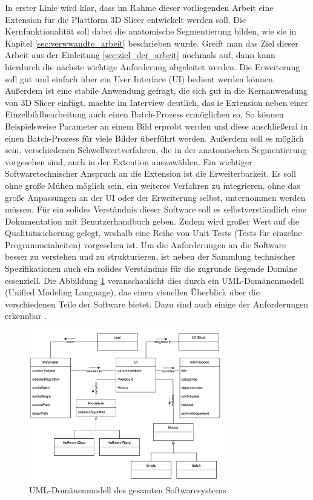 In erster Linie wird klar, dass im Rahme dieser vorliegenden Arbeit eine
Extension für die Plattform 3D Slicer entwickelt werden soll. Die Kernfunktionalität
soll dabei die anatomische Segmentierung bilden, wie sie in Kapitel
\ref{sec:verwwandte_arbeit} beschrieben wurde. Greift man das Ziel dieser Arbeit
aus der Einleitung \ref{sec:ziel_der_arbeit} nochmals auf, dann kann hierdurch
die nächste wichtige Anforderung abgeleitet werden. Die Erweiterung soll gut und
einfach über ein User Interface (UI) bedient werden können. Außerdem ist eine
stabile Anwendung gefragt, die sich gut in die Kernanwendung von 3D Slicer einfügt.
\citet[]{walter2025} machte im Interview deutlich, das ie Extension neben einer
Einzelbildbearbeitung auch einen Batch-Prozess ermöglichen so. So können Beispielsweise
Parameter an einem Bild erprobt werden und diese anschließend in einen Batch-Prozess
für viele Bilder überführt werden. Außerdem soll es möglich sein, verschiedenen Schwellwertverfahren,
die in der anatomischen Segmentierung vorgesehen sind, auch in der Extention auszuwählen.
Ein wichtiger Softwaretechnischer Anspruch an die Extension ist die
Erweiterbarkeit. Es soll ohne große Mühen möglich sein, ein weiteres Verfahren
zu integrieren, ohne das große Anpassungen an der UI oder der Erweiterung selbst,
unternommen werden müssen. Für ein solides Verständnis dieser Software soll es selbstverständlich
eine Dokumentation mit Benutzerhandbuch geben. Zudem wird großer Wert auf die
Qualitätssicherung gelegt, weshalb eine Reihe von Unit-Tests (Tests für einzelne
Programmeinheiten) vorgesehen ist. Um die Anforderungen an die Software besser
zu verstehen und zu strukturieren, ist neben der Sammlung technischer Spezifikationen
auch ein solides Verständnis für die zugrunde liegende Domäne essenziell. Die
Abbildung \ref{fig:3d_slicer_domäne} veranschaulicht dies durch ein UML-Domänenmodell
(Unified Modeling Language), das einen visuellen Überblick über die verschiedenen
Teile der Software bietet. Dazu sind auch einige der Anforderungen erkennbar
\citep[vgl.][]{walter2025}.

\begin{figure}[h]
	\centering
	\includegraphics[width=0.75\textwidth]{img/domaenenmodell.jpg}
	\caption{UML-Domänenmodell des gesamten Softwaresystems}
	\label{fig:3d_slicer_domäne}
\end{figure}

